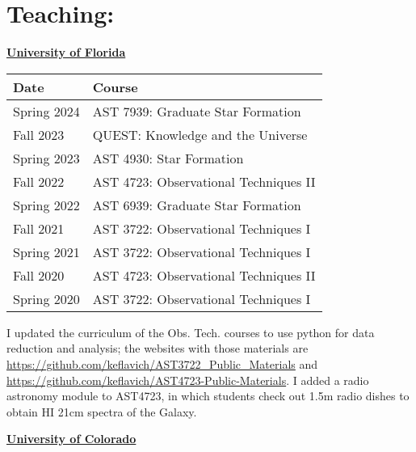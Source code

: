 \begin{minipage}{\textwidth}
\setlength{\extrarowheight}{4pt}
\section*{Teaching: }
\vspace{-6pt}

    \textbf{\underline{University of Florida}}

\begin{tabular}{ll}
    Date         & Course \\%
    \hline
     Spring 2024  &   AST 7939: Graduate Star Formation \\
     Fall 2023    &   QUEST: Knowledge and the Universe \\
     Spring 2023  &   AST 4930: Star Formation \\
     Fall 2022    &   AST 4723: Observational Techniques II \\
     Spring 2022  &   AST 6939: Graduate Star Formation \\
     Fall 2021    &   AST 3722: Observational Techniques I  \\%
     Spring 2021  &   AST 3722: Observational Techniques I  \\%
     Fall 2020    &   AST 4723: Observational Techniques II \\%
     Spring 2020  &   AST 3722: Observational Techniques I  \\%
     \hline
\end{tabular}

I updated the curriculum of the Obs. Tech. courses to use python for data reduction and analysis; 
the websites with those materials are \url{https://github.com/keflavich/AST3722_Public_Materials}
and \url{https://github.com/keflavich/AST4723-Public-Materials}.  I added a radio astronomy module to 
AST4723, in which students check out 1.5m radio dishes to obtain HI 21cm spectra of the Galaxy.

    \vspace{12pt}
\textbf{\underline{University of Colorado}}


\end{minipage}
